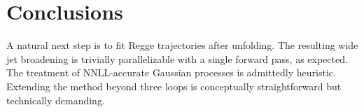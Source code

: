 \section{Conclusions}\label{sec:conclusions}

A natural next step is to fit Regge trajectories after unfolding. The
resulting wide jet broadening is trivially parallelizable with a single
forward pass, as expected. The treatment of NNLL-accurate Gaussian
processes is admittedly heuristic. Extending the method beyond three
loops is conceptually straightforward but technically demanding.

